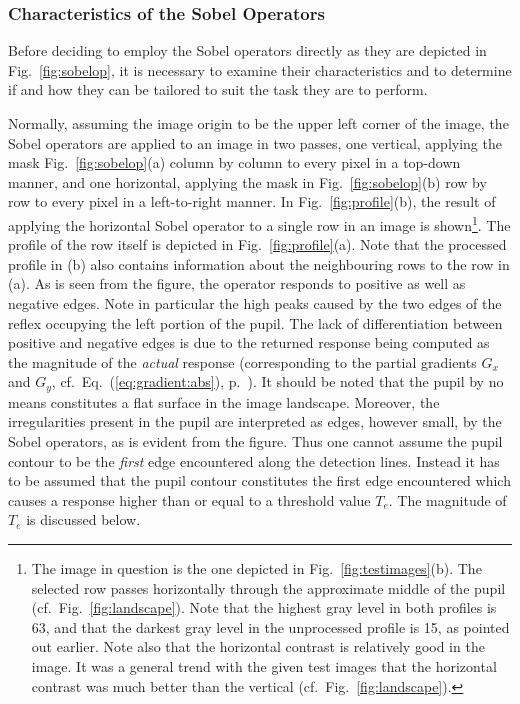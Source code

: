 \subsubsection{Characteristics of the Sobel Operators}

Before deciding to employ the Sobel operators directly as they are
depicted in Fig.~\ref{fig:sobelop}, it is necessary to examine their
characteristics and to determine if and how they can be tailored to
suit the task they are to perform.

Normally, assuming the image origin to be the upper left corner of the
image, the Sobel operators are applied to an image in two passes, one
vertical, applying the mask Fig.~\ref{fig:sobelop}(a) column by column
to every pixel in a top-down manner, and one horizontal, applying the
mask in Fig.~\ref{fig:sobelop}(b) row by row to every pixel in a
left-to-right manner.  In Fig.~\ref{fig:profile}(b), the result of
applying the horizontal Sobel operator to a single row in an image is
shown\footnote{The image in question is the one depicted in
  Fig.~\ref{fig:testimages}(b).  The selected row passes horizontally
  through the approximate middle of the pupil (cf.\ 
  Fig.~\ref{fig:landscape}).  Note that the highest gray level in both
  profiles is 63, and that the darkest gray level in the unprocessed
  profile is 15, as pointed out earlier.  Note also that the
  horizontal contrast is relatively good in the image.  It was a
  general trend with the given test images that the horizontal
  contrast was much better than the vertical (cf.\ 
  Fig.~\ref{fig:landscape}).}.  The profile of the row itself is
depicted in Fig.~\ref{fig:profile}(a).  Note that the processed
profile in (b) also contains information about the neighbouring rows
to the row in (a).  As is seen from the figure, the operator responds
to positive as well as negative edges.  Note in particular the high
peaks caused by the two edges of the reflex occupying the left portion
of the pupil.  The lack of differentiation between positive and
negative edges is due to the returned response being computed as the
magnitude of the {\em actual\/} response (corresponding to the partial
gradients $G_{x}$ and $G_{y}$, cf.\ Eq.~(\ref{eq:gradient:abs}),
p.~\pageref{eq:gradient:abs}).  It should be noted that the pupil by
no means constitutes a flat surface in the image landscape.  Moreover,
the irregularities present in the pupil are interpreted as edges,
however small, by the Sobel operators, as is evident from the figure.
Thus one cannot assume the pupil contour to be the {\em first\/} edge
encountered along the detection lines.  Instead it has to be assumed
that the pupil contour constitutes the first edge encountered which
causes a response higher than or equal to a threshold value $T_{e}$.
The magnitude of $T_{e}$ is discussed below.

